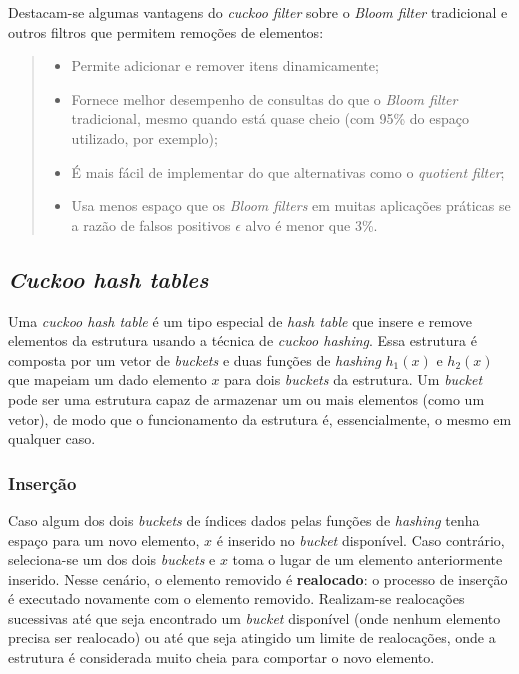 \documentclass[12pt,twoside,english,brazilian]{article}
\begin{document}
Destacam-se algumas vantagens do \textit{cuckoo filter} sobre o \textit{Bloom filter} tradicional e outros filtros que permitem remoções de elementos:

\begin{quote}
    \begin{itemize}
        \item Permite adicionar e remover itens dinamicamente;
        \item Fornece melhor desempenho de consultas do que o \textit{Bloom filter} tradicional, mesmo quando está quase cheio (com 95\% do espaço utilizado, por exemplo);
        \item É mais fácil de implementar do que alternativas como o \textit{quotient filter};
        \item Usa menos espaço que os \textit{Bloom filters} em muitas aplicações práticas se a razão de falsos positivos $\epsilon$ alvo é menor que 3\%. \citep[tradução nossa]{cuckoo}
    \end{itemize}
\end{quote}

\subsection{\textit{Cuckoo hash tables}}

Uma \textit{cuckoo hash table} é um tipo especial de \textit{hash table} que insere e remove elementos da estrutura usando a técnica de \textit{cuckoo hashing}. Essa estrutura é composta por um vetor de \textit{buckets} e duas funções de \textit{hashing} $h_1(x)$ e $h_2(x)$ que mapeiam um dado elemento $x$ para dois \textit{buckets} da estrutura. Um \textit{bucket} pode ser uma estrutura capaz de armazenar um ou mais elementos (como um vetor), de modo que o funcionamento da estrutura é, essencialmente, o mesmo em qualquer caso.

\subsubsection{Inserção}

Caso algum dos dois \textit{buckets} de índices dados pelas funções de \textit{hashing} tenha espaço para um novo elemento, $x$ é inserido no \textit{bucket} disponível. Caso contrário, seleciona-se um dos dois \textit{buckets} e $x$ toma o lugar de um elemento anteriormente inserido. Nesse cenário, o elemento removido é \textbf{realocado}: o processo de inserção é executado novamente com o elemento removido. Realizam-se realocações sucessivas até que seja encontrado um \textit{bucket} disponível (onde nenhum elemento precisa ser realocado) ou até que seja atingido um limite de realocações, onde a estrutura é considerada muito cheia para comportar o novo elemento.
\end{document}
